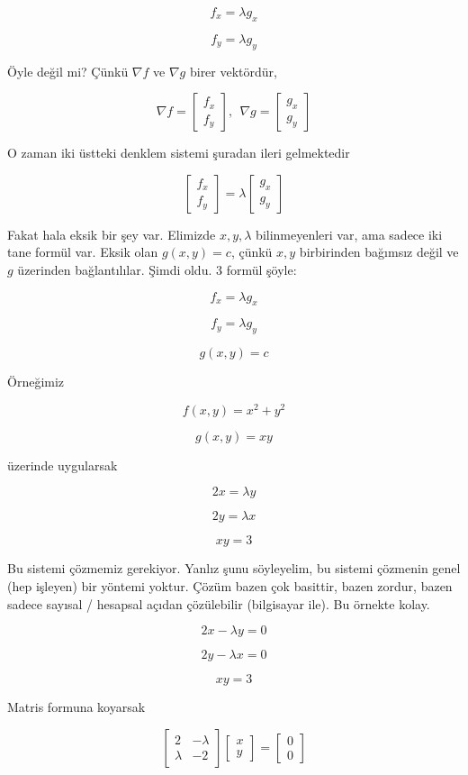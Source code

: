 \documentclass[12pt,fleqn]{article}\usepackage{../../common}
\begin{document}
$$ f_x = \lambda g_x $$

$$ f_y = \lambda g_y $$

Öyle değil mi? Çünkü $\nabla f$ ve $\nabla g$ birer vektördür, 

$$ 
\nabla f =
\left[\begin{array}{r}
f_x \\
f_y
\end{array}\right], \ \ 
\nabla g =
\left[\begin{array}{r}
g_x \\
g_y
\end{array}\right]
$$

O zaman iki üstteki denklem sistemi şuradan ileri gelmektedir

$$ 
\left[\begin{array}{r}
f_x \\
f_y
\end{array}\right]  = 
\lambda
\left[\begin{array}{r}
g_x \\
g_y
\end{array}\right]
$$

Fakat hala eksik bir şey var. Elimizde $x,y,\lambda$ bilinmeyenleri var,
ama sadece iki tane formül var. Eksik olan $g(x,y) = c$, çünkü $x,y$
birbirinden bağımsız değil ve $g$ üzerinden bağlantılılar. Şimdi oldu. 3
formül şöyle:

$$ f_x = \lambda g_x $$

$$ f_y = \lambda g_y $$

$$ g(x,y) = c $$

Örneğimiz 

$$ f(x,y) = x^2 + y^2 $$

$$ g(x,y) = xy  $$

üzerinde uygularsak

$$ 2x = \lambda y $$

$$ 2y = \lambda x $$

$$ xy = 3 $$

Bu sistemi çözmemiz gerekiyor. Yanlız şunu söyleyelim, bu sistemi çözmenin genel
(hep işleyen) bir yöntemi yoktur. Çözüm bazen çok basittir, bazen zordur, bazen
sadece sayısal / hesapsal açıdan çözülebilir (bilgisayar ile). Bu örnekte kolay.

$$ 2x - \lambda y = 0$$

$$ 2y - \lambda x = 0 $$

$$ xy = 3 $$

Matris formuna koyarsak

$$ 
\left[\begin{array}{rr}
2 & -\lambda \\
\lambda & -2
\end{array}\right]
\left[\begin{array}{r}
x \\ y
\end{array}\right]
=
\left[\begin{array}{r}
0 \\ 0
\end{array}\right]
 $$
\end{document}

